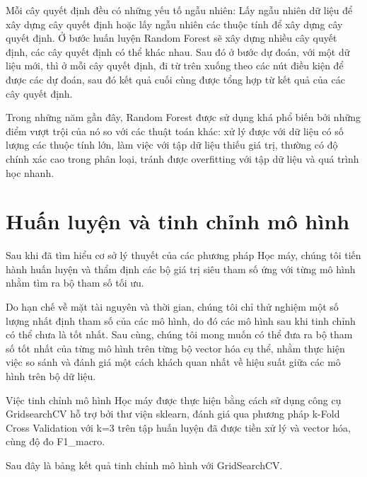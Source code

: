 \documentclass[12pt,a4paper,oneside]{book}
\begin{document}
		Mỗi cây quyết định đều có những yếu tố ngẫu nhiên: Lấy ngẫu nhiên dữ liệu để xây dựng cây quyết định hoặc lấy ngẫu nhiên các thuộc tính để xây dựng cây quyết định.
		Ở bước huấn luyện Random Forest sẽ xây dựng nhiều cây quyết định, các cây quyết định có thể khác nhau. Sau đó ở bước dự đoán, với một dữ liệu mới, thì ở mỗi cây quyết định, đi từ trên xuống theo các nút điều kiện để được các dự đoán, sau đó kết quả cuối cùng được tổng hợp từ kết quả của các cây quyết định.
		
		Trong những năm gần đây, Random Forest được sử dụng khá phổ biến bởi những điểm vượt trội của nó so với các thuật toán khác: xử lý được với dữ liệu có số lượng các thuộc tính lớn, làm việc với tập dữ liệu thiếu giá trị, thường có độ chính xác cao trong phân loại, tránh được overfitting với tập dữ liệu và quá trình học nhanh.
		
	\section{Huấn luyện và tinh chỉnh mô hình}
		Sau khi đã tìm hiểu cơ sở lý thuyết của các phương pháp Học máy, chúng tôi tiến hành huấn luyện và thẩm định các bộ giá trị siêu tham số ứng với từng mô hình nhằm tìm ra bộ tham số tối ưu.
		
		Do hạn chế về mặt tài nguyên và thời gian, chúng tôi chỉ thử nghiệm một số lượng nhất định tham số của các mô hình, do đó các mô hình sau khi tinh chỉnh có thể chưa là tốt nhất. Sau cùng, chúng tôi mong muốn có thể đưa ra bộ tham số tốt nhất của từng mô hình trên từng bộ vector hóa cụ thể, nhằm thực hiện việc so sánh và đánh giá một cách khách quan nhất về hiệu suất giữa các mô hình trên bộ dữ liệu.
		
		Việc tinh chỉnh mô hình Học máy được thực hiện bằng cách sử dụng công cụ GridsearchCV hỗ trợ bởi thư viện sklearn, đánh giá qua phương pháp k-Fold Cross Validation với k=3 trên tập huấn luyện đã được tiền xử lý và vector hóa, cùng độ đo F1\_macro.
	
		Sau đây là bảng kết quả tinh chỉnh mô hình với GridSearchCV.
	
\end{document}
